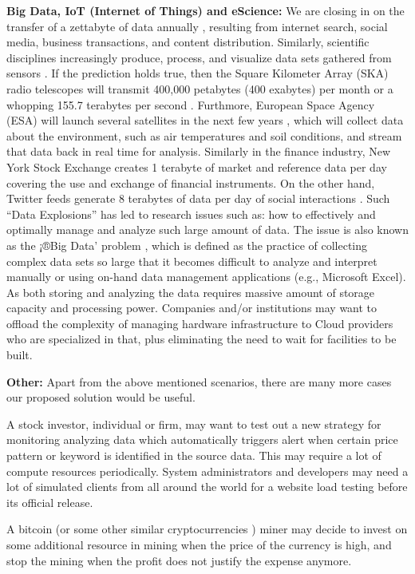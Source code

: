 \documentclass[journal]{IEEEtran}
\begin{document}
\textbf{Big Data, IoT (Internet of Things) and eScience:} We are closing in on the transfer of a zettabyte of data annually \cite{ref11}, resulting from internet search, social media, business transactions, and content distribution. Similarly, scientific disciplines increasingly produce, process, and visualize data sets gathered from sensors \cite{GHadoop}. If the prediction holds true, then the Square Kilometer Array (SKA) radio telescopes will transmit 400,000 petabytes (400 exabytes) per month or a whopping 155.7 terabytes per second \cite{ref12}. Furthmore, European Space Agency (ESA) will launch several satellites in the next few years \cite{ref13}, which will collect data about the environment, such as air temperatures and soil conditions, and stream that data back in real time for analysis.  Similarly in the finance industry, New York Stock Exchange creates 1 terabyte of market and reference data per day covering the use and exchange of financial instruments. On the other hand, Twitter feeds generate 8 terabytes of data per day of social interactions \cite{ref14}. Such ``Data Explosions'' has led to research issues such as: how to effectively and optimally manage and analyze such large amount of data. The issue is also known as the ¡®Big Data' problem    \cite{hey2003data}, which is defined as the practice of collecting complex data sets so large that it becomes difficult to analyze and interpret manually or using on-hand data management applications (e.g., Microsoft Excel). As both storing and analyzing the data requires massive amount of storage capacity and processing power. Companies and/or institutions may want to offload the complexity of managing hardware infrastructure to Cloud providers who are specialized in that, plus eliminating the need to wait for facilities to be built.

\textbf{Other:} Apart from the above mentioned scenarios, there are many more cases our proposed solution would be useful.


A stock investor, individual or firm, may want to test out a new strategy for monitoring analyzing data which automatically triggers alert when certain price pattern or keyword is identified in the source data. This may require a lot of compute resources periodically.
System administrators and developers may need a lot of simulated clients from all around the world for a website load testing before its official release.


A bitcoin    \cite{bedford2013bitcoin} (or some other similar cryptocurrencies \cite{ref17}) miner may decide to invest on some additional resource in mining when the price of the currency is high, and stop the mining when the profit does not justify the expense anymore.
\end{document}
